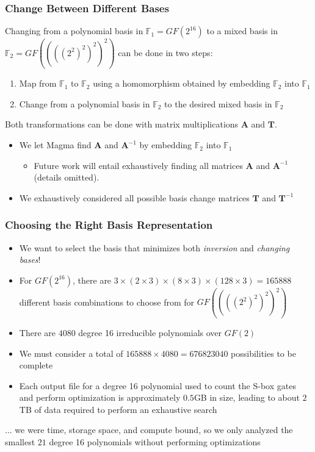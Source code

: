 \documentclass[handout,10pt]{beamer}
\begin{document}
\begin{frame}
	\frametitle{Change Between Different Bases}
	Changing from a polynomial basis in $\mathbb{F}_1 = GF(2^{16})$ to a mixed basis in $\mathbb{F}_2 = GF((((2^2)^2)^2)^2)$ can be done in two steps:
	\begin{enumerate}
		\item Map from $\mathbb{F}_1$ to $\mathbb{F}_2$ using a homomorphism obtained by embedding $\mathbb{F}_2$ into $\mathbb{F}_1$
		\item Change from a polynomial basis in $\mathbb{F}_2$ to the desired mixed basis in $\mathbb{F}_2$
	\end{enumerate}

	\medskip
	\pause
	Both transformations can be done with matrix multiplications $\mathbf{A}$ and $\mathbf{T}$.
	\begin{itemize}
		\item We let Magma find $\mathbf{A}$ and $\mathbf{A}^{-1}$ by embedding $\mathbb{F}_2$ into $\mathbb{F}_1$
		\begin{itemize}
			\item Future work will entail exhaustively finding all matrices $\mathbf{A}$ and $\mathbf{A}^{-1}$ (details omitted).
		\end{itemize}
		\item We exhaustively considered all possible basis change matrices $\mathbf{T}$ and $\mathbf{T}^{-1}$
	\end{itemize}
	
	\medskip
\end{frame}

\begin{frame}
	\frametitle{Choosing the Right Basis Representation}
	\begin{itemize}
		\item We want to select the basis that minimizes both \emph{inversion} and \emph{changing bases}!
		\item For $GF(2^{16})$, there are $3 \times (2 \times 3) \times (8 \times 3) \times (128 \times 3) = 165888$ different basis combinations to choose from for $GF((((2^2)^2)^2)^2)$
		\item There are $4080$ degree 16 irreducible polynomials over $GF(2)$
		\pause
		\item We must consider a total of $165888 \times 4080 = 676823040$ possibilities to be complete
		\item Each output file for a degree 16 polynomial used to count the S-box gates and perform optimization is approximately $0.5$GB in size, leading to about $2$TB of data required to perform an exhaustive search
	\end{itemize}
	\pause
	\begin{center}
	... we were time, storage space, and compute bound, so we only analyzed the smallest $21$ degree 16 polynomials without performing optimizations
	\end{center}
\end{frame}
\end{document}
